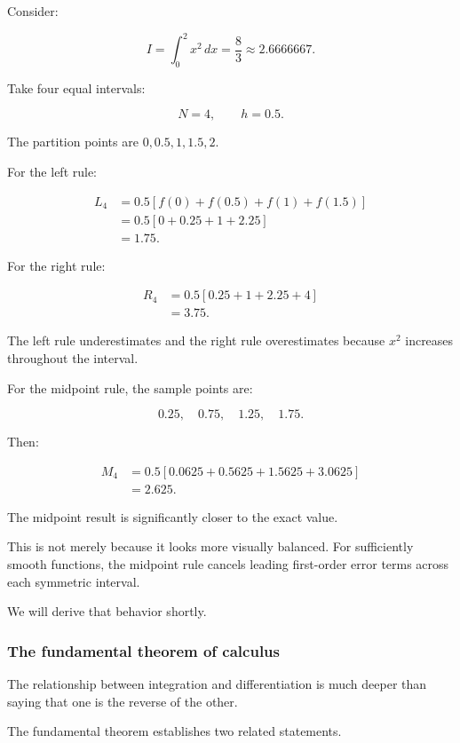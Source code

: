 Consider:

\[
I=\int_0^2x^2\,dx=\frac83\approx2.6666667.
\]

Take four equal intervals:

\[
N=4,\qquad h=0.5.
\]

The partition points are \(0,0.5,1,1.5,2\).

For the left rule:

\[
\begin{aligned} L_4 &=0.5[f(0)+f(0.5)+f(1)+f(1.5)]\\ &=0.5[0+0.25+1+2.25]\\ &=\boxed{1.75}. \end{aligned}
\]

For the right rule:

\[
\begin{aligned} R_4 &=0.5[0.25+1+2.25+4]\\ &=\boxed{3.75}. \end{aligned}
\]

The left rule underestimates and the right rule overestimates because \(x^2\) increases throughout the interval.

For the midpoint rule, the sample points are:

\[
0.25,\quad0.75,\quad1.25,\quad1.75.
\]

Then:

\[
\begin{aligned} M_4 &=0.5[0.0625+0.5625+1.5625+3.0625]\\ &=\boxed{2.625}. \end{aligned}
\]

The midpoint result is significantly closer to the exact value.

This is not merely because it looks more visually balanced. For sufficiently smooth functions, the midpoint rule cancels leading first-order error terms across each symmetric interval.

We will derive that behavior shortly.

\subsubsection{The fundamental theorem of calculus}\label{02-foundations-ii-ch022-the-fundamental-theorem-of-calculus}

The relationship between integration and differentiation is much deeper than saying that one is the reverse of the other.

The fundamental theorem establishes two related statements.

